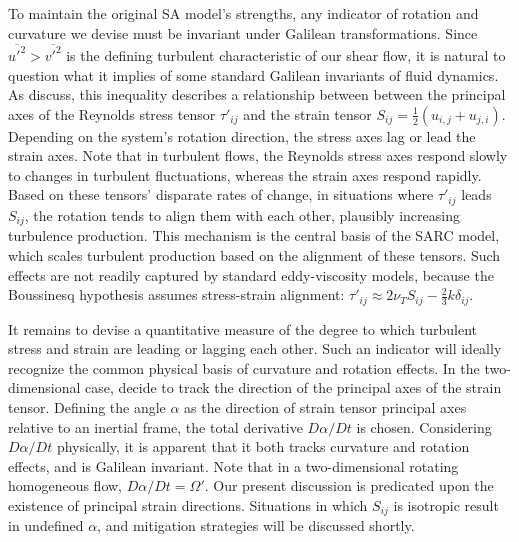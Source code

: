 \documentclass[11pt]{article}
\begin{document}
To maintain the original SA model's strengths, any indicator of rotation and curvature we devise must be invariant under Galilean transformations. Since $\overline{u'^2} > \overline{v'^2}$ is the defining turbulent characteristic of our shear flow, it is natural to question what it implies of some standard Galilean invariants of fluid dynamics. As \citet{spalart1997} discuss, this inequality describes a relationship between between the principal axes of the Reynolds stress tensor $\tau'_{ij}$ and the strain tensor $S_{ij} = \tfrac{1}{2} (u_{i,j} + u_{j,i})$. Depending on the system's rotation direction, the stress axes lag or lead the strain axes. Note that in turbulent flows, the Reynolds stress axes respond slowly to changes in turbulent fluctuations, whereas the strain axes respond rapidly. Based on these tensors' disparate rates of change, in situations where $\tau'_{ij}$ leads $S_{ij}$, the rotation tends to align them with each other, plausibly increasing turbulence production. This mechanism is the central basis of the SARC model, which scales turbulent production based on the alignment of these tensors. Such effects are not readily captured by standard eddy-viscosity models, because the Boussinesq hypothesis assumes stress-strain alignment: $\tau'_{ij} \approx 2 \nu_T S_{ij} - \tfrac{2}{3} k \delta_{ij}$.

It remains to devise a quantitative measure of the degree to which turbulent stress and strain are leading or lagging each other. Such an indicator will ideally recognize the common physical basis of curvature and rotation effects. In the two-dimensional case, \citet{spalart1997} decide to track the direction of the principal axes of the strain tensor. Defining the angle $\alpha$ as the direction of strain tensor principal axes relative to an inertial frame, the total derivative $D \alpha / D t$ is chosen. Considering $D \alpha / D t$ physically, it is apparent that it both tracks curvature and rotation effects, and is Galilean invariant. Note that in a two-dimensional rotating homogeneous flow, $D \alpha / D t = \Omega'$. Our present discussion is predicated upon the existence of principal strain directions. Situations in which $S_{ij}$ is isotropic result in undefined $\alpha$, and mitigation strategies will be discussed shortly.
\end{document}
